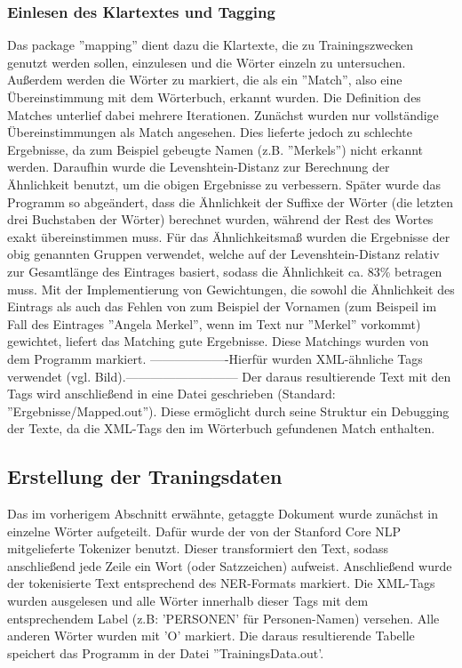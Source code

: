 \documentclass[a4paper]{article}
\begin{document}
		\subsubsection{Einlesen des Klartextes und Tagging}
			Das package ''mapping'' dient dazu die Klartexte, die zu Trainingszwecken genutzt werden sollen, einzulesen und die Wörter einzeln zu untersuchen. 
			Außerdem werden die Wörter zu markiert, die als ein ''Match'', also eine Übereinstimmung mit dem Wörterbuch, erkannt wurden.
			Die Definition des Matches unterlief dabei mehrere Iterationen.
			Zunächst wurden nur vollständige Übereinstimmungen als Match angesehen.
			Dies lieferte jedoch zu schlechte Ergebnisse, da zum Beispiel gebeugte Namen (z.B. ''Merkels'') nicht erkannt werden.
			Daraufhin wurde die Levenshtein-Distanz zur Berechnung der Ähnlichkeit benutzt, um die obigen Ergebnisse zu verbessern.
			Später wurde das Programm so abgeändert, dass die Ähnlichkeit der Suffixe der Wörter (die letzten drei Buchstaben der Wörter) berechnet wurden, während der Rest des Wortes exakt übereinstimmen muss.
			Für das Ähnlichkeitsmaß wurden die Ergebnisse der obig genannten Gruppen verwendet, welche auf der Levenshtein-Distanz relativ zur Gesamtlänge des Eintrages basiert, sodass die Ähnlichkeit ca. 83\% betragen muss.
			Mit der Implementierung von Gewichtungen, die sowohl die Ähnlichkeit des Eintrags als auch das Fehlen von zum Beispiel der Vornamen (zum Beispeil im Fall des Eintrages ''Angela Merkel'', wenn im Text nur ''Merkel'' vorkommt) gewichtet, liefert das Matching gute Ergebnisse.
			Diese Matchings wurden von dem Programm markiert.
			-------------------Hierfür wurden XML-ähnliche Tags verwendet (vgl. Bild).---------------------------
			Der daraus resultierende Text mit den Tags wird anschließend in eine Datei geschrieben (Standard: ''Ergebnisse/Mapped.out'').
			Diese ermöglicht durch seine Struktur ein Debugging der Texte, da die XML-Tags den im Wörterbuch gefundenen Match enthalten.

	\subsection{Erstellung der Traningsdaten}
		Das im vorherigem Abschnitt erwähnte, getaggte Dokument wurde zunächst in einzelne Wörter aufgeteilt.
		Dafür wurde der von der Stanford Core NLP mitgelieferte Tokenizer benutzt.
		Dieser transformiert den Text, sodass anschließend jede Zeile ein Wort (oder Satzzeichen) aufweist.
		Anschließend wurde der tokenisierte Text entsprechend des NER-Formats markiert. 
		Die XML-Tags wurden ausgelesen und alle Wörter innerhalb dieser Tags mit dem entsprechendem Label (z.B: 'PERSONEN' für Personen-Namen) versehen. 
		Alle anderen Wörter wurden mit 'O' markiert.
		Die daraus resultierende Tabelle speichert das Programm in der Datei ''TrainingsData.out'.
\end{document}
